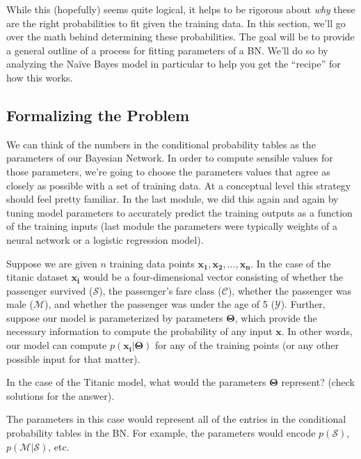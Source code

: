 \documentclass[assignment03_Solutions]{subfiles}
\begin{document}
While this (hopefully) seems quite logical, it helps to be rigorous about \emph{why} these are the right probabilities to fit given the training data.  In this section, we'll go over the math behind determining these probabilities.  The goal will be to provide a general outline of a process for fitting parameters of a BN.  We'll do so by analyzing the Na\"ive Bayes model in particular to help you get the ``recipe'' for how this works.

\subsection{Formalizing the Problem}
We can think of the numbers in the conditional probability tables as the parameters of our Bayesian Network.  In order to compute sensible values for those parameters, we're going to choose the parameters values that agree as closely as possible with a set of training data.  At a conceptual level this strategy should feel pretty familiar.  In the last module, we did this again and again by tuning model parameters to accurately predict the training outputs as a function of the training inputs (last module the parameters were typically weights of a neural network or a logistic regression model).

Suppose we are given $n$ training data points $\mathbf{x_1}, \mathbf{x_2}, \ldots, \mathbf{x_n}$.  In the case of the titanic dataset $\mathbf{x_i}$ would be a four-dimensional vector consisting of whether the passenger survived ($\mathcal{S}$), the passenger's fare class ($\mathcal{C}$), whether the passenger was male ($\mathcal{M}$), and whether the passenger was under the age of 5 ($\mathcal{Y}$).  Further, suppose our model is parameterized by parameters $\mathbf{\Theta}$, which provide the necessary information to compute the probability of any input $\mathbf{x}$.  In other words, our model can compute $p(\mathbf{x_i} | \mathbf{\Theta})$ for any of the training points (or any other possible input for that matter).

\begin{understandingcheck}
In the case of the Titanic model, what would the parameters $\mathbf{\Theta}$ represent? (check solutions for the answer).
\begin{boxedsolution}
The parameters in this case would represent all of the entries in the conditional probability tables in the BN.  For example, the parameters would encode $p(\mathcal{S})$, $p(\mathcal{M}|\mathcal{S})$, etc.
\end{boxedsolution}
\end{understandingcheck}
\end{document}

